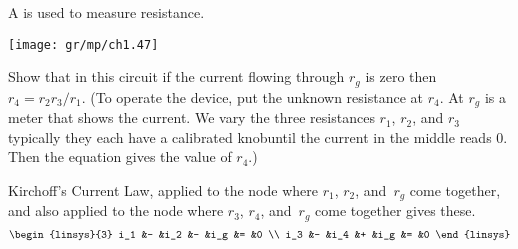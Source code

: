 \begin{exercises}
\item \label{exer:WheatstoneBr} 
   A 
   is used to measure resistance. 
   \begin{center}
     \texttt{[image: gr/mp/ch1.47]}
   \end{center}
   Show that in this circuit if the current
   flowing through $r_g$ is zero then $r_4=r_2r_3/r_1$.
   (To operate the device, put the unknown
   resistance at $r_4$.
   At $r_g$ is a meter that shows the current.
   We vary the three resistances $r_1$, $r_2$, and $r_3$\Dash typically
   they each have a calibrated knob\Dash until the 
   current in the middle reads $0$.
   Then the equation gives the value of $r_4$.)
   \begin{answer}
     Kirchoff's Current Law, applied to the node where 
     $r_1$, $r_2$, and~$r_g$ come together, and also 
     applied to the node where $r_3$, $r_4$, and~$r_g$ come
     together gives these.
     \begin{equation*}
       \begin{linsys}{3}
         i_1 &- &i_2 &- &i_g &= &0  \\
         i_3 &- &i_4 &+ &i_g &= &0  
       \end{linsys}

\end{equation*}
\end{answer}
\end{exercises}
